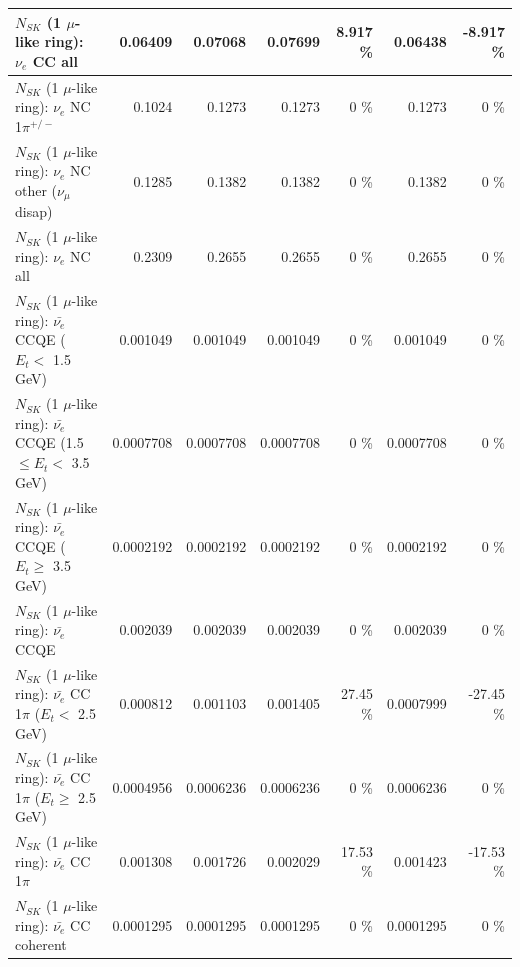 \begin{table}
\begin{tabular}{| l | r | r | r  r | r  r |}
                                  $N_{SK}$ (1 $\mu$-like ring): $\nu_{e}$ CC all &         0.06409 &         0.07068 &         0.07699 &    8.917 \%  &         0.06438 &   -8.917 \%  \\ 
\hline
                           $N_{SK}$ (1 $\mu$-like ring): $\nu_e$ NC 1$\pi^{+/-}$ &          0.1024 &          0.1273 &          0.1273 &        0 \%  &          0.1273 &        0 \%  \\ 
                $N_{SK}$ (1 $\mu$-like ring): $\nu_e$ NC other ($\nu_\mu$ disap) &          0.1285 &          0.1382 &          0.1382 &        0 \%  &          0.1382 &        0 \%  \\ 
                                  $N_{SK}$ (1 $\mu$-like ring): $\nu_{e}$ NC all &          0.2309 &          0.2655 &          0.2655 &        0 \%  &          0.2655 &        0 \%  \\ 
\hline
\hline
\hline
            $N_{SK}$ (1 $\mu$-like ring): $\bar{\nu_e}$ CCQE ($E_{t} <$ 1.5 GeV) &        0.001049 &        0.001049 &        0.001049 &        0 \%  &        0.001049 &        0 \%  \\ 
   $N_{SK}$ (1 $\mu$-like ring): $\bar{\nu_e}$ CCQE (1.5 $\leq E_{t} <$ 3.5 GeV) &       0.0007708 &       0.0007708 &       0.0007708 &        0 \%  &       0.0007708 &        0 \%  \\ 
         $N_{SK}$ (1 $\mu$-like ring): $\bar{\nu_e}$ CCQE ($E_{t} \geq$ 3.5 GeV) &       0.0002192 &       0.0002192 &       0.0002192 &        0 \%  &       0.0002192 &        0 \%  \\ 
\hline
                                $N_{SK}$ (1 $\mu$-like ring): $\bar{\nu_e}$ CCQE &        0.002039 &        0.002039 &        0.002039 &        0 \%  &        0.002039 &        0 \%  \\ 
\hline
       $N_{SK}$ (1 $\mu$-like ring): $\bar{\nu_e}$ CC 1$\pi$ ($E_{t} <$ 2.5 GeV) &        0.000812 &        0.001103 &        0.001405 &    27.45 \%  &       0.0007999 &   -27.45 \%  \\ 
    $N_{SK}$ (1 $\mu$-like ring): $\bar{\nu_e}$ CC 1$\pi$ ($E_{t} \geq$ 2.5 GeV) &       0.0004956 &       0.0006236 &       0.0006236 &        0 \%  &       0.0006236 &        0 \%  \\ 
\hline
                           $N_{SK}$ (1 $\mu$-like ring): $\bar{\nu_e}$ CC 1$\pi$ &        0.001308 &        0.001726 &        0.002029 &    17.53 \%  &        0.001423 &   -17.53 \%  \\ 
                         $N_{SK}$ (1 $\mu$-like ring): $\bar{\nu_e}$ CC coherent &       0.0001295 &       0.0001295 &       0.0001295 &        0 \%  &       0.0001295 &        0 \%  \\ 

\end{tabular}
\end{table}
